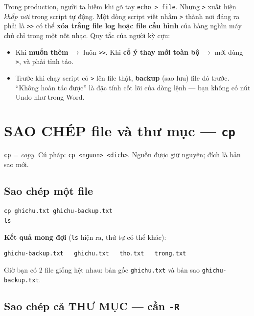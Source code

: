 \documentclass[12pt,a4paper]{article}
\newcommand{\cmd}[1]{\texttt{#1}}
\begin{document}
\begin{seniorbox}[title={Góc Senior \#1 --- \texttt{>} vs \texttt{>>} và bài học ``không hoàn tác''}]
Trong production, người ta hiếm khi gõ tay \cmd{echo > file}. Nhưng \cmd{>} xuất hiện \textit{khắp nơi} trong script tự động. Một dòng script viết nhầm \cmd{>} thành nơi đáng ra phải là \cmd{>>} có thể \textbf{xóa trắng file log hoặc file cấu hình} của hàng nghìn máy chủ chỉ trong một nốt nhạc. Quy tắc của người kỳ cựu:

\begin{itemize}[leftmargin=1.4em]
\item Khi \textbf{muốn thêm} $\rightarrow$ luôn \cmd{>>}. Khi \textbf{cố ý thay mới toàn bộ} $\rightarrow$ mới dùng \cmd{>}, và phải tỉnh táo.
\item Trước khi chạy script có \cmd{>} lên file thật, \textbf{backup} (sao lưu) file đó trước. ``Không hoàn tác được'' là đặc tính cốt lõi của dòng lệnh --- bạn không có nút Undo như trong Word.
\end{itemize}
\end{seniorbox}

\section{SAO CHÉP file và thư mục --- \texttt{cp}}

\cmd{cp} = \textit{copy}. Cú pháp: \cmd{cp <nguon> <dich>}. Nguồn được giữ nguyên; đích là bản sao mới.

\subsection{Sao chép một file}

\begin{Verbatim}
cp ghichu.txt ghichu-backup.txt
ls
\end{Verbatim}

\textbf{Kết quả mong đợi} (\cmd{ls} hiện ra, thứ tự có thể khác):
\begin{Verbatim}
ghichu-backup.txt   ghichu.txt   tho.txt   trong.txt
\end{Verbatim}

Giờ bạn có 2 file giống hệt nhau: bản gốc \cmd{ghichu.txt} và bản sao \cmd{ghichu-backup.txt}.

\subsection{Sao chép cả THƯ MỤC --- cần \texttt{-R}}
\end{document}
